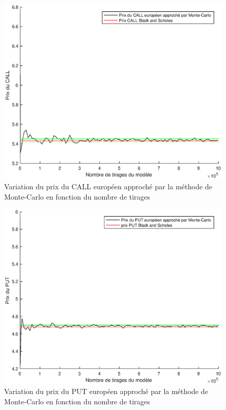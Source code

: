 \begin{figure}[H]
\centering
\includegraphics[scale=0.6]{./img/CALL_EURO_MC-BS.eps}
\caption{Variation du prix du CALL européen approché par la méthode de Monte-Carlo en fonction du nombre de tirages}
\label{fig:call_euro_mc}
\end{figure}

\begin{figure}[H]
\centering
\includegraphics[scale=0.6]{./img/PUT_EURO_MC-BS.eps}
\caption{Variation du prix du PUT européen approché par la méthode de Monte-Carlo en fonction du nombre de tirages}
\label{fig:put_euro_mc}
\end{figure}

